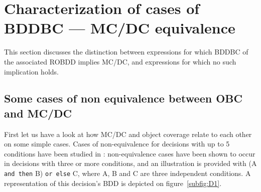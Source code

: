 \documentclass[a4paper,12pt,twoside]{article}
\newcommand{\andthen}{\texttt{and then}}
\newcommand{\orelse}{\texttt{or else}}
\begin{document}
\section{Characterization of cases of BDDBC --- MC/DC equivalence}

This section discusses the distinction between expressions for which
BDDBC of the associated ROBDD implies MC/DC, and expressions for which
no such implication holds.

\subsection{Some cases of non equivalence between OBC and MC/DC}

First let us have a look at how MC/DC and object coverage relate to each
other on some simple cases. Cases of non-equivalence for decisions with up to
5 conditions have been studied in \cite{ar0720}: non-equivalence cases
have been shown to occur in decisions with three or more conditions,
and an illustration is provided with (A \andthen{} B) \orelse{} C,
where A, B and C are three independent conditions.
%
A representation of this decision's BDD is depicted on
figure~\ref{subfig:D1}.
\end{document}
